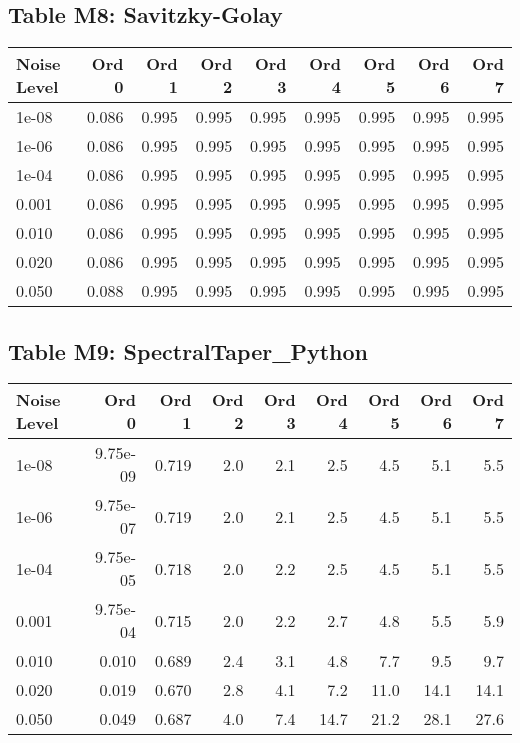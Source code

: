 \clearpage

\subsection*{Table M8: Savitzky-Golay}

\begin{longtable}{lrrrrrrrr}
\toprule
\textbf{Noise Level} & \textbf{Ord 0} & \textbf{Ord 1} & \textbf{Ord 2} & \textbf{Ord 3} & \textbf{Ord 4} & \textbf{Ord 5} & \textbf{Ord 6} & \textbf{Ord 7} \\
\midrule
\endhead
1e-08 & 0.086 & 0.995 & 0.995 & 0.995 & 0.995 & 0.995 & 0.995 & 0.995 \\
1e-06 & 0.086 & 0.995 & 0.995 & 0.995 & 0.995 & 0.995 & 0.995 & 0.995 \\
1e-04 & 0.086 & 0.995 & 0.995 & 0.995 & 0.995 & 0.995 & 0.995 & 0.995 \\
0.001 & 0.086 & 0.995 & 0.995 & 0.995 & 0.995 & 0.995 & 0.995 & 0.995 \\
0.010 & 0.086 & 0.995 & 0.995 & 0.995 & 0.995 & 0.995 & 0.995 & 0.995 \\
0.020 & 0.086 & 0.995 & 0.995 & 0.995 & 0.995 & 0.995 & 0.995 & 0.995 \\
0.050 & 0.088 & 0.995 & 0.995 & 0.995 & 0.995 & 0.995 & 0.995 & 0.995 \\
\bottomrule
\end{longtable}

\clearpage

\subsection*{Table M9: SpectralTaper\_Python}

\begin{longtable}{lrrrrrrrr}
\toprule
\textbf{Noise Level} & \textbf{Ord 0} & \textbf{Ord 1} & \textbf{Ord 2} & \textbf{Ord 3} & \textbf{Ord 4} & \textbf{Ord 5} & \textbf{Ord 6} & \textbf{Ord 7} \\
\midrule
\endhead
1e-08 & 9.75e-09 & 0.719 & 2.0 & 2.1 & 2.5 & 4.5 & 5.1 & 5.5 \\
1e-06 & 9.75e-07 & 0.719 & 2.0 & 2.1 & 2.5 & 4.5 & 5.1 & 5.5 \\
1e-04 & 9.75e-05 & 0.718 & 2.0 & 2.2 & 2.5 & 4.5 & 5.1 & 5.5 \\
0.001 & 9.75e-04 & 0.715 & 2.0 & 2.2 & 2.7 & 4.8 & 5.5 & 5.9 \\
0.010 & 0.010 & 0.689 & 2.4 & 3.1 & 4.8 & 7.7 & 9.5 & 9.7 \\
0.020 & 0.019 & 0.670 & 2.8 & 4.1 & 7.2 & 11.0 & 14.1 & 14.1 \\
0.050 & 0.049 & 0.687 & 4.0 & 7.4 & 14.7 & 21.2 & 28.1 & 27.6 \\
\bottomrule
\end{longtable}

